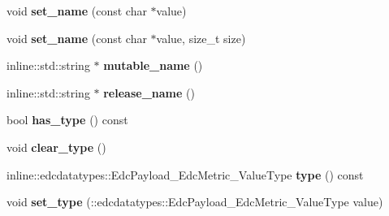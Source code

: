 \begin{DoxyCompactItemize}
\item 
\hypertarget{classedcdatatypes_1_1_edc_payload___edc_metric_ac1a62d3c9eb3e37be0be2519452d1edf}{void {\bfseries set\-\_\-name} (const char $\ast$value)}\label{classedcdatatypes_1_1_edc_payload___edc_metric_ac1a62d3c9eb3e37be0be2519452d1edf}

\item 
\hypertarget{classedcdatatypes_1_1_edc_payload___edc_metric_a5520872ac0102a78f3e5c37ece9a5712}{void {\bfseries set\-\_\-name} (const char $\ast$value, size\-\_\-t size)}\label{classedcdatatypes_1_1_edc_payload___edc_metric_a5520872ac0102a78f3e5c37ece9a5712}

\item 
\hypertarget{classedcdatatypes_1_1_edc_payload___edc_metric_a6e0b1200d6ad87f5d04240dc0769c7b8}{inline\-::std\-::string $\ast$ {\bfseries mutable\-\_\-name} ()}\label{classedcdatatypes_1_1_edc_payload___edc_metric_a6e0b1200d6ad87f5d04240dc0769c7b8}

\item 
\hypertarget{classedcdatatypes_1_1_edc_payload___edc_metric_a94ab2439db9cf872cedb95c33ca35f47}{inline\-::std\-::string $\ast$ {\bfseries release\-\_\-name} ()}\label{classedcdatatypes_1_1_edc_payload___edc_metric_a94ab2439db9cf872cedb95c33ca35f47}

\item 
\hypertarget{classedcdatatypes_1_1_edc_payload___edc_metric_a4bbc60b8c73ac729acc087c9a400bdbe}{bool {\bfseries has\-\_\-type} () const }\label{classedcdatatypes_1_1_edc_payload___edc_metric_a4bbc60b8c73ac729acc087c9a400bdbe}

\item 
\hypertarget{classedcdatatypes_1_1_edc_payload___edc_metric_a6a5ba0d0594375fe822b2925700b8b01}{void {\bfseries clear\-\_\-type} ()}\label{classedcdatatypes_1_1_edc_payload___edc_metric_a6a5ba0d0594375fe822b2925700b8b01}

\item 
\hypertarget{classedcdatatypes_1_1_edc_payload___edc_metric_a1bc79b68688befd214b0abd29d15cc7d}{inline\-::edcdatatypes\-::\-Edc\-Payload\-\_\-\-Edc\-Metric\-\_\-\-Value\-Type {\bfseries type} () const }\label{classedcdatatypes_1_1_edc_payload___edc_metric_a1bc79b68688befd214b0abd29d15cc7d}

\item 
\hypertarget{classedcdatatypes_1_1_edc_payload___edc_metric_a48973a71a45578d5110a741a523f73f3}{void {\bfseries set\-\_\-type} (\-::edcdatatypes\-::\-Edc\-Payload\-\_\-\-Edc\-Metric\-\_\-\-Value\-Type value)}\label{classedcdatatypes_1_1_edc_payload___edc_metric_a48973a71a45578d5110a741a523f73f3}


\end{DoxyCompactItemize}
